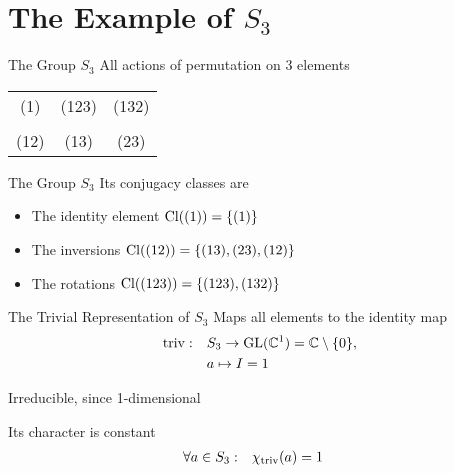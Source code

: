 
\section{The Example of $S_3$}

\begin{frame}{The Group $S_3$}
    \large
    All actions of permutation on $3$ elements

    \pause
    \vspace{2em}
    \centering
    \begin{tabular}{c c c}
        (1)  & (123) & (132) \\\\
        (12) & (13)  & (23)
    \end{tabular}
\end{frame}

%    

\begin{frame}{The Group $S_3$}
    \large
    Its conjugacy classes are

    \pause
    \vspace{1em}
    \begin{itemize}
        \item The identity element \hspace*{\fill} $\operatorname{Cl}((1)) = \{(1)\}$ \pause
        \item The inversions \hspace*{\fill} $\operatorname{Cl}((12)) = \{(13), (23), (12)\}$ \pause
        \item The rotations \hspace*{\fill} $\operatorname{Cl}((123)) = \{(123), (132)\}$
    \end{itemize}
\end{frame}

\begin{frame}{The Trivial Representation of $S_3$}
    \large
    Maps all elements to the identity map
    \pause
    \begin{align*}
        \operatorname{triv}: \quad & S_3 \to \operatorname{GL}(\mathbb{C}^1) = \mathbb{C} \setminus \{0\}, \\
        & a \mapsto I = 1
    \end{align*}

    \pause
    Irreducible, since 1-dimensional

    \pause
    Its character is constant
    \begin{align*}
        \forall a \in S_3: \quad & \chi_{\operatorname{triv}}(a) = 1
    \end{align*}
\end{frame}

